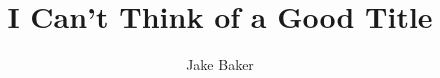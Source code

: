 \documentclass[a4wide, 12pt]{article}
\begin{document}
\title{I Can't Think of a Good Title}
\author{Jake Baker}

\maketitle
{}
\thispagestyle{empty}




\pagestyle{fancy}
\cfoot{\thepage}
\tableofcontents
\clearpage
\setcounter{page}{1}






%
\printbibliography
\end{document}
